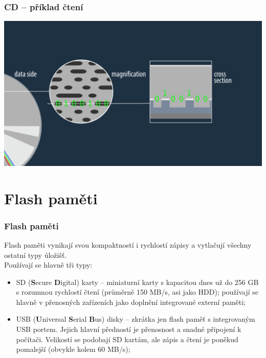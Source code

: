 \documentclass[aspectratio=169,11pt,svgnames,handout]{beamer}
\begin{document}
\begin{frame}
 \frametitle{CD -- příklad čtení}
 \begin{center}
  \includegraphics[width=.8\textwidth]{cd_reading}
 \end{center}
\end{frame}

\section{Flash paměti}

\begin{frame}
 \frametitle{Flash paměti}
 Flash paměti vynikají svou kompaktností i rychlostí zápisy a vytlačují všechny
 ostatní typy úložišť.\\
 \pause
 Používají se hlavně tři typy:
 \begin{itemize}[label=\textbullet]
  \item SD (\textbf{S}ecure \textbf{D}igital) karty -- miniaturní karty s
   kapacitou dnes už do 256 GB s rozumnou rychlostí čtení (průměrně 150 MB/s,
   asi jako HDD); používají se hlavně v přenosných zařízeních jako doplnění
   integrované externí paměti;
  \pause
 \item USB (\textbf{U}niversal \textbf{S}erial \textbf{B}us) disky -- zkrátka
  jen flash paměť s integrovaným USB portem. Jejich hlavní předností je
  přenosnost a snadné připojení k počítači. Velikostí se podobají SD kartám, ale
  zápis a čtení je poněkud pomalejší (obvykle kolem 60 MB/s);
 \end{itemize}
\end{frame}
\end{document}
